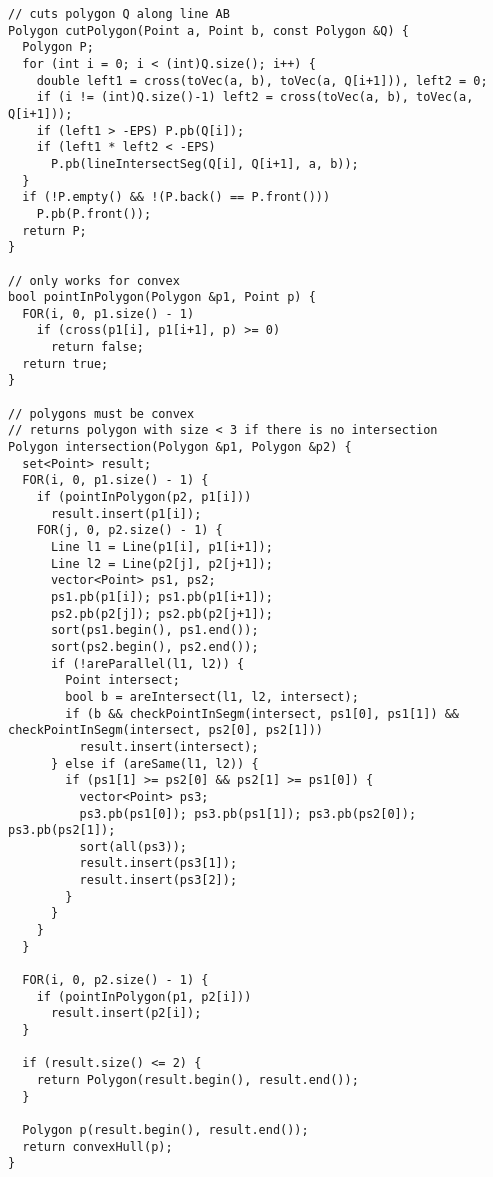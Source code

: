 \documentclass[11pt, oneside]{article}
\begin{document}
\begin{lstlisting}
// cuts polygon Q along line AB
Polygon cutPolygon(Point a, Point b, const Polygon &Q) {
  Polygon P;
  for (int i = 0; i < (int)Q.size(); i++) {
    double left1 = cross(toVec(a, b), toVec(a, Q[i+1])), left2 = 0;
    if (i != (int)Q.size()-1) left2 = cross(toVec(a, b), toVec(a, Q[i+1]));
    if (left1 > -EPS) P.pb(Q[i]);
    if (left1 * left2 < -EPS)
      P.pb(lineIntersectSeg(Q[i], Q[i+1], a, b));
  }
  if (!P.empty() && !(P.back() == P.front()))
    P.pb(P.front());
  return P;
}

// only works for convex
bool pointInPolygon(Polygon &p1, Point p) {
  FOR(i, 0, p1.size() - 1)
    if (cross(p1[i], p1[i+1], p) >= 0)
      return false;
  return true;
}

// polygons must be convex
// returns polygon with size < 3 if there is no intersection
Polygon intersection(Polygon &p1, Polygon &p2) {
  set<Point> result;
  FOR(i, 0, p1.size() - 1) {
    if (pointInPolygon(p2, p1[i]))
      result.insert(p1[i]);
    FOR(j, 0, p2.size() - 1) {
      Line l1 = Line(p1[i], p1[i+1]);
      Line l2 = Line(p2[j], p2[j+1]);
      vector<Point> ps1, ps2;
      ps1.pb(p1[i]); ps1.pb(p1[i+1]);
      ps2.pb(p2[j]); ps2.pb(p2[j+1]);
      sort(ps1.begin(), ps1.end());
      sort(ps2.begin(), ps2.end());
      if (!areParallel(l1, l2)) {
        Point intersect;
        bool b = areIntersect(l1, l2, intersect);
        if (b && checkPointInSegm(intersect, ps1[0], ps1[1]) && checkPointInSegm(intersect, ps2[0], ps2[1]))
          result.insert(intersect);          
      } else if (areSame(l1, l2)) {
        if (ps1[1] >= ps2[0] && ps2[1] >= ps1[0]) {
          vector<Point> ps3;
          ps3.pb(ps1[0]); ps3.pb(ps1[1]); ps3.pb(ps2[0]); ps3.pb(ps2[1]);
          sort(all(ps3));
          result.insert(ps3[1]);
          result.insert(ps3[2]);
        }
      }
    }
  }

  FOR(i, 0, p2.size() - 1) {
    if (pointInPolygon(p1, p2[i]))
      result.insert(p2[i]);
  }

  if (result.size() <= 2) {
    return Polygon(result.begin(), result.end());
  }

  Polygon p(result.begin(), result.end());
  return convexHull(p);
}
\end{lstlisting}
\end{document}
